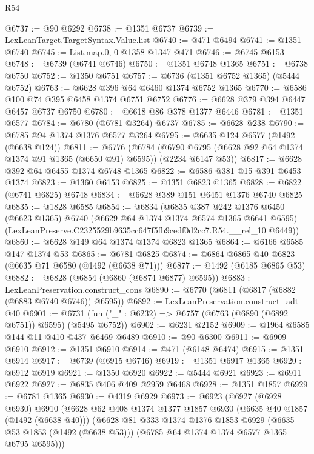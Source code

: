 \begin{lexlean}{R54}
\begin{coremodule}
@6737 := @90 @6292
@6738 := @1351 @6737
@6739 := LexLeanTarget.TargetSyntax.Value.list
@6740 := @471 @6494
@6741 := @1351 @6740
@6745 := List.map.{0, 0} @1358 @1347 @471
@6746 := @6745 @6153
@6748 := @6739 (@6741 @6746)
@6750 := @1351 @6748 @1365
@6751 := @6738 @6750
@6752 := @1350 @6751
@6757 := @6736 (@1351 @6752 @1365) (@5444 @6752)
@6763 := @6628 @396 @64 @6460 @1374 @6752 @1365
@6770 := @6586 @100 @74 @395 @6458 @1374 @6751 @6752
@6776 := @6628 @379 @394 @6447 @6457 @6737 @6750
@6780 := @6618 @86 @378 @1377 @6446
@6781 := @1351 @6577
@6784 := @6780 (@6781 @3264) @6737
@6785 := @6628 @238
@6790 := @6785 @94 @1374 @1376 @6577 @3264
@6795 := @6635 @124 @6577 (@1492 (@6638 @124))
@6811 := @6776
    (@6784 (@6790 @6795 (@6628 @92 @64 @1374 @1374 @91 @1365 (@6650 @91) @6595)) (@2234 @6147 @53))
@6817 := @6628 @392 @64 @6455 @1374 @6748 @1365
@6822 := @6586 @381 @15 @391 @6453 @1374
@6823 := @1360 @6153
@6825 := @1351 @6823 @1365
@6828 := @6822 (@6741 @6825) @6748
@6834 := @6628 @389 @151 @6451 @1376 @6740 @6825
@6835 := @1828 @6585
@6854 := @6834
    (@6835
      @387
      @242
      @1376
      @6450
      (@6623 @1365)
      @6740
      (@6629 @64 @1374 @1374 @6574 @1365 @6641 @6595)
      (LexLeanPreserve.C2325529b9635cc647f5fb9cedf0d2cc7.R54.__rel_10 @6449))
@6860 := @6628 @149 @64 @1374 @1374 @6823 @1365
@6864 := @6166 @6585 @147 @1374 @53
@6865 := @6781 @6825
@6874 := @6864 @6865 @40 @6823 (@6635 @71 @6580 (@1492 (@6638 @71)))
@6877 := @1492 (@6185 @6865 @53)
@6882 := @6828 (@6854 (@6860 (@6874 @6877) @6595))
@6883 := LexLeanPreservation.construct_cons
@6890 := @6770 (@6811 (@6817 (@6882 (@6883 @6740 @6746)) @6595))
@6892 := LexLeanPreservation.construct_adt @40
@6901 := @6731 (fun ("_" : @6232) => @6757 (@6763 (@6890 (@6892 @6751)) @6595) (@5495 @6752))
@6902 := @6231 @2152
@6909 := @1964 @6585 @144 @11 @410 @437 @6469 @6489
@6910 := @90 @6300
@6911 := @6909 @6910
@6912 := @1351 @6910
@6914 := @471 (@6148 @6474)
@6915 := @1351 @6914
@6917 := @6739 (@6915 @6746)
@6919 := @1351 @6917 @1365
@6920 := @6912 @6919
@6921 := @1350 @6920
@6922 := @5444 @6921
@6923 := @6911 @6922
@6927 := @6835 @406 @409 @2959 @6468
@6928 := @1351 @1857
@6929 := @6781 @1365
@6930 := @4319 @6929
@6973 := @6923
    (@6927
      (@6928 @6930)
      @6910
      (@6628
        @62
        @408
        @1374
        @1377
        @1857
        @6930
        (@6635 @40 @1857 (@1492 (@6638 @40)))
        (@6628
          @81
          @333
          @1374
          @1376
          @1853
          @6929
          (@6635 @53 @1853 (@1492 (@6638 @53)))
          (@6785 @64 @1374 @1374 @6577 @1365 @6795 @6595)))

\end{coremodule}
\end{lexlean}
